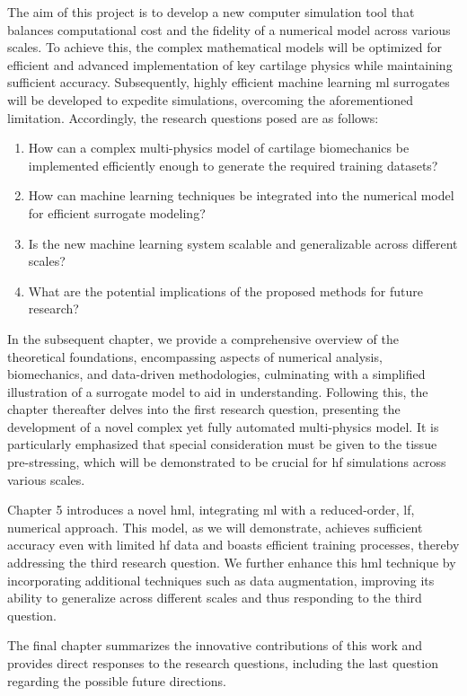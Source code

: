 \documentclass[12pt,a4paper]{report}
\begin{document}
The aim of this project is to develop a new computer simulation tool that balances computational cost and the fidelity of a numerical model across various scales. To achieve this, the complex mathematical models will be optimized for efficient and advanced implementation of key cartilage physics while maintaining sufficient accuracy. Subsequently, highly efficient machine learning \ac{ml} surrogates will be developed to expedite simulations, overcoming the aforementioned limitation. Accordingly, the research questions posed are as follows:
%
\begin{enumerate}
    \item How can a complex multi-physics model of cartilage biomechanics be implemented efficiently enough to generate the required training datasets?
    \item How can machine learning techniques be integrated into the numerical model for efficient surrogate modeling?
    \item Is the new machine learning system scalable and generalizable across different scales?
    \item What are the potential implications of the proposed methods for future research?
\end{enumerate}

In the subsequent chapter, we provide a comprehensive overview of the theoretical foundations, encompassing aspects of numerical analysis, biomechanics, and data-driven methodologies, culminating with a simplified illustration of a surrogate model to aid in understanding. Following this, the chapter thereafter delves into the first research question, presenting the development of a novel complex yet fully automated multi-physics model. It is particularly emphasized that special consideration must be given to the tissue pre-stressing, which will be demonstrated to be crucial for \ac{hf} simulations across various scales.

Chapter 5 introduces a novel \ac{hml}, integrating \ac{ml} with a reduced-order, \ac{lf}, numerical approach. This model, as we will demonstrate, achieves sufficient accuracy even with limited \ac{hf} data and boasts efficient training processes, thereby addressing the third research question. We further enhance this \ac{hml} technique by incorporating additional techniques such as data augmentation, improving its ability to generalize across different scales and thus responding to the third question.

The final chapter summarizes the innovative contributions of this work and provides direct responses to the research questions, including the last question regarding the possible future directions.
\end{document}
